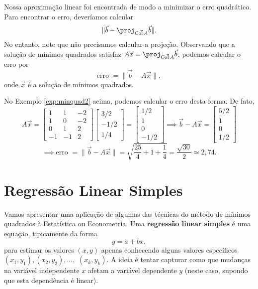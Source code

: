 Nossa aproximação linear foi encontrada de modo a minimizar o erro quadrático. Para encontrar o erro, deveríamos calcular
\begin{equation}
\| \vec{b} - \proj_{\vec{\operatorname{Col} A}} \vec{b} \|.
\end{equation} No entanto, note que não precisamos calcular a projeção. Observando que a solução de mínimos quadrados satisfaz $A \vec{x} = \proj_{\vec{\operatorname{Col} A}} \vec{b}$, podemos calcular o erro por
\begin{equation}
\text{erro } = \| \vec{b} - A \vec{x} \|,
\end{equation} onde $\vec{x}$ é a solução de mínimos quadrados.

No Exemplo \ref{exp:minquad2} acima, podemos calcular o erro desta forma. De fato,
\begin{equation}
A \vec{x} =
\begin{bmatrix}
  1 & 1 & -2 \\
  1 & 0 & -2 \\
  0 & 1 &  2 \\
  -1 & -1&  2
\end{bmatrix}
\begin{bmatrix}
  3/2 \\ -1/2 \\ 1/4
\end{bmatrix} =
\begin{bmatrix}
  1/2 \\ 1 \\ 0 \\ -1/2
\end{bmatrix} \implies
\vec{b} - A\vec{x} =
\begin{bmatrix}
  5/2 \\ 1 \\ 0 \\ 1/2
\end{bmatrix}
\end{equation}
\begin{equation}
\implies \text{erro } = \| \vec{b} - A \vec{x} \| = \sqrt{\frac{25}{4} + 1 + \frac{1}{4}} = \frac{\sqrt{30}}{2} \simeq 2,74.
\end{equation}





\section{Regressão Linear Simples}

Vamos apresentar uma aplicação de algumas das técnicas do método de mínimos quadrados à Estatística ou Econometria. Uma \textbf{regressão linear simples} é uma equação, tipicamente da forma
\begin{equation}
y = a + b x,
\end{equation} para estimar os valores $(x,y)$ apenas conhecendo alguns valores específicos $(x_1, y_1), (x_2, y_2), \dots,$ $(x_k, y_k)$. A ideia é tentar capturar como que mudanças na variável independente $x$ afetam a variável dependente $y$ (neste caso, supondo que esta dependência é linear).

